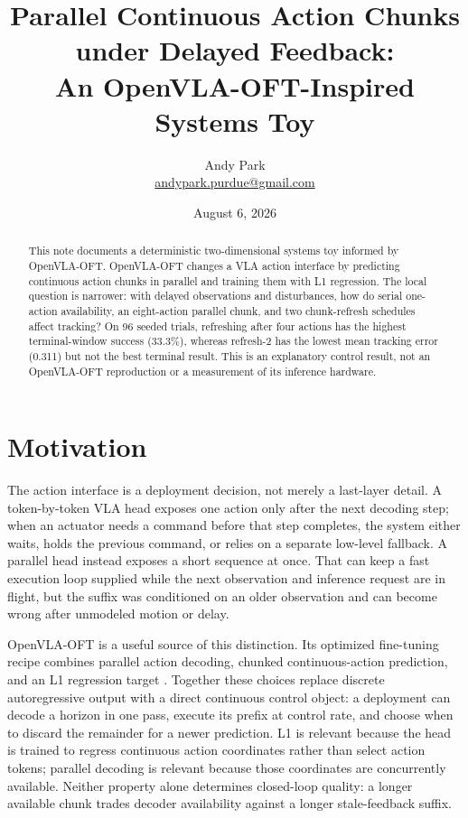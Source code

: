 \documentclass[11pt]{article}
\title{Parallel Continuous Action Chunks under Delayed Feedback:\\An OpenVLA-OFT-Inspired Systems Toy}
\author{Andy Park\\\href{mailto:andypark.purdue@gmail.com}{andypark.purdue@gmail.com}}
\date{August 6, 2026}
\begin{document}
\maketitle

\begin{abstract}
This note documents a deterministic two-dimensional systems toy informed by OpenVLA-OFT. OpenVLA-OFT changes a VLA action interface by predicting continuous action chunks in parallel and training them with L1 regression. The local question is narrower: with delayed observations and disturbances, how do serial one-action availability, an eight-action parallel chunk, and two chunk-refresh schedules affect tracking? On 96 seeded trials, refreshing after four actions has the highest terminal-window success (33.3\%), whereas refresh-2 has the lowest mean tracking error (0.311) but not the best terminal result. This is an explanatory control result, not an OpenVLA-OFT reproduction or a measurement of its inference hardware.
\end{abstract}

\section{Motivation}

The action interface is a deployment decision, not merely a last-layer detail. A token-by-token VLA head exposes one action only after the next decoding step; when an actuator needs a command before that step completes, the system either waits, holds the previous command, or relies on a separate low-level fallback. A parallel head instead exposes a short sequence at once. That can keep a fast execution loop supplied while the next observation and inference request are in flight, but the suffix was conditioned on an older observation and can become wrong after unmodeled motion or delay.

OpenVLA-OFT is a useful source of this distinction. Its optimized fine-tuning recipe combines parallel action decoding, chunked continuous-action prediction, and an L1 regression target \cite{oftpaper,oftsite,oftcode}. Together these choices replace discrete autoregressive output with a direct continuous control object: a deployment can decode a horizon in one pass, execute its prefix at control rate, and choose when to discard the remainder for a newer prediction. L1 is relevant because the head is trained to regress continuous action coordinates rather than select action tokens; parallel decoding is relevant because those coordinates are concurrently available. Neither property alone determines closed-loop quality: a longer available chunk trades decoder availability against a longer stale-feedback suffix.
\end{document}

